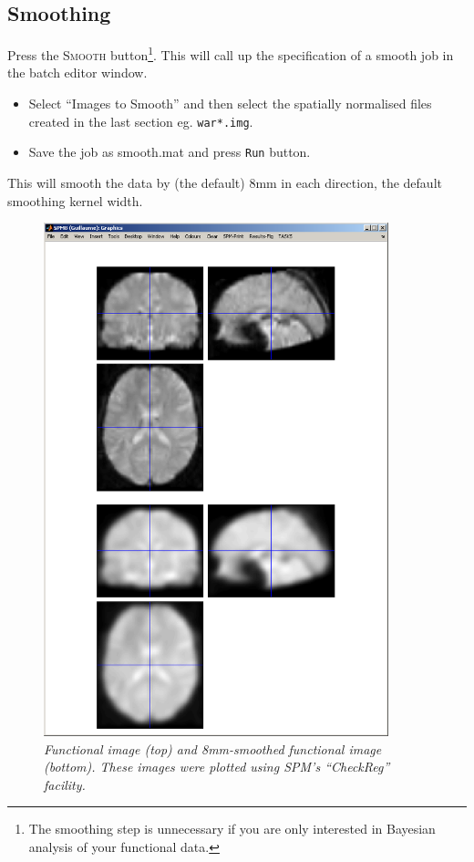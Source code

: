 \subsection{Smoothing}

Press the \textsc{Smooth} button\footnote{The smoothing step is unnecessary if you are only interested in Bayesian analysis of your functional data.}. This will call up the specification of a smooth job in the batch editor window.

\begin{itemize}
\item Select ``Images to Smooth'' and then select the spatially normalised files created in the last section eg. \texttt{war*.img}.
\item Save the job as {\sf smooth.mat} and press \texttt{Run} button.
\end{itemize}

This will smooth the data by (the default) 8mm in each direction, the default smoothing kernel width.

\begin{figure}
\begin{center}
\includegraphics[width=100mm]{faces/smooth}
\caption{\em Functional image (top) and 8mm-smoothed functional image (bottom). These images were plotted using SPM's ``CheckReg'' facility. \label{face_smooth}}
\end{center}
\end{figure}

